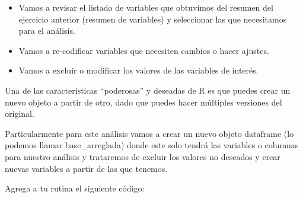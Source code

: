 \documentclass[
  letterpaper,
  DIV=11,
  numbers=noendperiod]{scrreprt}
\begin{document}
\begin{itemize}
\item
  Vamos a revisar el listado de variables que obtuvimos del resumen del
  ejercicio anterior (resumen de variables) y seleccionar las que
  necesitamos para el análisis.
\item
  Vamos a re-codificar variables que necesiten cambios o hacer ajustes.
\item
  Vamos a excluir o modificar los valores de las variables de interés.
\end{itemize}

Una de las características ``poderosas'' y deseadas de R es que puedes
crear un nuevo objeto a partir de otro, dado que puedes hacer múltiples
versiones del original.

Particularmente para este análisis vamos a crear un nuevo objeto
dataframe (lo podemos llamar base\_arreglada) donde este solo tendrá las
variables o columnas para nuestro análisis y trataremos de excluir los
valores no deseados y crear nuevas variables a partir de las que
tenemos.

Agrega a tu rutina el siguiente código:
\end{document}
